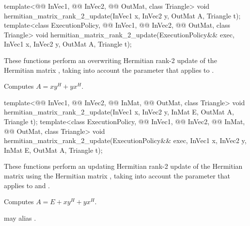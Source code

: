%
\begin{itemdecl}
template<@@ InVec1, @@ InVec2,
         @@ OutMat, class Triangle>
  void hermitian_matrix_rank_2_update(InVec1 x, InVec2 y, OutMat A, Triangle t);
template<class ExecutionPolicy, @@ InVec1, @@ InVec2,
         @@ OutMat, class Triangle>
  void hermitian_matrix_rank_2_update(ExecutionPolicy&& exec,
                                      InVec1 x, InVec2 y, OutMat A, Triangle t);
\end{itemdecl}

\begin{itemdescr}
\pnum
These functions perform
an overwriting Hermitian rank-2 update of the Hermitian matrix ,
taking into account the  parameter
that applies to .

\pnum
\effects
Computes $A = x y^H + y x^H$.
\end{itemdescr}

%
\begin{itemdecl}
template<@@ InVec1, @@ InVec2, @@ InMat,
         @@ OutMat, class Triangle>
  void hermitian_matrix_rank_2_update(InVec1 x, InVec2 y, InMat E, OutMat A, Triangle t);
template<class ExecutionPolicy, @@ InVec1, @@ InVec2, @@ InMat,
         @@ OutMat, class Triangle>
  void hermitian_matrix_rank_2_update(ExecutionPolicy&& exec,
                                      InVec1 x, InVec2 y, InMat E, OutMat A, Triangle t);
\end{itemdecl}

\begin{itemdescr}
\pnum
These functions perform
an updating Hermitian rank-2 update of the Hermitian matrix 
using the Hermitian matrix ,
taking into account the  parameter
that applies to  and .

\pnum
\effects
Computes $A = E + x y^H + y x^H$.

\pnum
\remarks
{} may alias .
\end{itemdescr}

